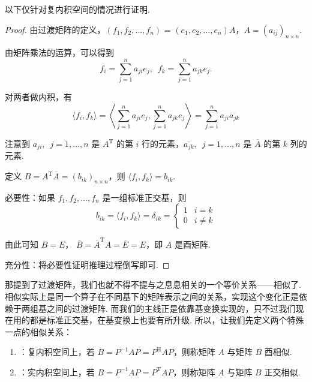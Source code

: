以下仅针对复内积空间的情况进行证明.

\begin{proof}
    由过渡矩阵的定义，$ (f_1, f_2, \ldots , f_n) $ = $ (e_1, e_2, \ldots , e_n)A $，$ A = (a_{ij})_{n \times n} $.

    由矩阵乘法的运算，可以得到
    \[ f_i = \sum_{j = 1}^{n} a_{ji}e_j , \enspace f_k = \sum_{j = 1}^{n} a_{jk}e_j. \]

    对两者做内积，有
    \[ \langle f_i, f_k \rangle = \left\langle \sum_{j = 1}^{n} a_{ji}e_j, \sum_{j = 1}^{n} a_{jk}e_j \right\rangle = \sum_{j = 1}^{n} a_{ji}\overline{a_{jk}} \]

    注意到 $ a_{ji},\enspace j = 1, \ldots , n $ 是 $ A^{\mathrm{T}} $ 的第 $ i $ 行的元素，$ \overline{a_{jk}},\enspace j = 1, \ldots , n $ 是 $ \overline{A} $ 的第 $ k $ 列的元素.

    定义 $ B = A^{\mathrm{T}}\overline{A} = (b_{ik})_{n \times n} $，则 $ \langle f_i, f_k \rangle = b_{ik} $.

    必要性：如果 $ f_1, f_2, \ldots , f_n $ 是一组标准正交基，则
    \[b_{ik} = \langle f_i, f_k \rangle = \delta_{ik} =
        \begin{cases}
            1 & i = k    \\
            0 & i \neq k
        \end{cases}\]

    由此可知 $ B = E $， $ \overline{B} = \overline{A}^{\mathrm{T}} A = \overline{E} = E $，即 $ A $ 是酉矩阵.

    充分性：将必要性证明推理过程倒写即可.
\end{proof}

那提到了过渡矩阵，我们也就不得不提与之息息相关的一个等价关系——相似了. 相似实际上是同一个算子在不同基下的矩阵表示之间的关系，实现这个变化正是依赖于两组基之间的过渡矩阵. 而我们的主线正是依靠基变换实现的，只不过我们现在用的都是标准正交基，在基变换上也要有所升级. 所以，让我们先定义两个特殊一点的相似关系：

\begin{definition}{}{}
    \begin{enumerate}
        \item {}：复内积空间上，若 $ B = P^{-1}AP = P^{\mathrm{H}}AP $，则称矩阵 $ A $ 与矩阵 $ B $ 酉相似.

        \item {}：实内积空间上，若 $ B = P^{-1}AP = P^{\mathrm{T}}AP $，则称矩阵 $ A $ 与矩阵 $ B $ 正交相似.
    \end{enumerate}
\end{definition}

